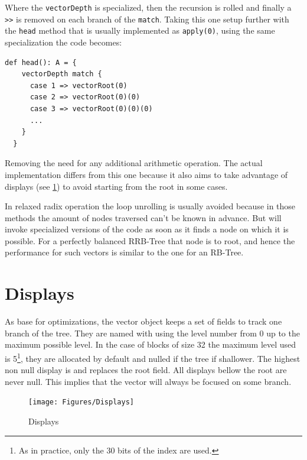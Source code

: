 Where the \texttt{vectorDepth} is specialized, then the recursion is rolled and finally a \texttt{>>} is removed on each branch of the \texttt{match}. Taking this one setup further with the \texttt{head} method that is usually implemented as \texttt{apply(0)}, using the same specialization the code becomes:

\begin{lstlisting}[frame=single]
def head(): A = {
    vectorDepth match {
      case 1 => vectorRoot(0)
      case 2 => vectorRoot(0)(0)
      case 3 => vectorRoot(0)(0)(0)
      ...
    }
  }
\end{lstlisting}
Removing the need for any additional arithmetic operation. The actual implementation differs from this one because it also aims to take advantage of displays (see \ref{sec:Displays}) to avoid starting from the root in some cases.

In relaxed radix operation the loop unrolling is usually avoided because in those methods the amount of nodes traversed can't be known in advance. But will invoke specialized versions of the code as soon as it finds a node on which it is possible. For a perfectly balanced RRB-Tree that node is to root, and hence the performance for such vectors is similar to the one for an RB-Tree.

\clearpage
\section{Displays}
\label{sec:Displays}
As base for optimizations, the vector object keeps a set of fields to track one branch of the tree. They are named with using the level number from 0 up to the maximum possible level. In the case of blocks of size 32 the maximum level used is 5\footnote{As in practice, only the 30 bits of the index are used.}, they are allocated by default and nulled if the tree if shallower. The highest non null display is and replaces the root field. All displays bellow the root are never null. This implies that the vector will always be focused on some branch.

\begin{figure}[h!]
  \centering
  \texttt{[image: Figures/Displays]}
  \label{Displays}
  \caption{Displays}
\end{figure}

